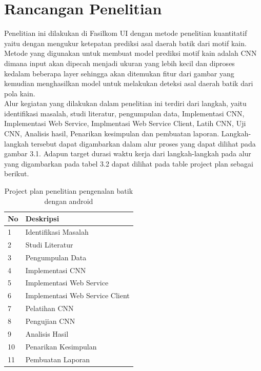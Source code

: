 \section{Rancangan Penelitian}
Penelitian ini dilakukan di Fasilkom UI dengan metode penelitian kuantitatif yaitu dengan mengukur ketepatan prediksi asal daerah batik dari motif kain. Metode yang digunakan untuk membuat model prediksi motif kain adalah CNN dimana input akan dipecah menjadi ukuran yang lebih kecil dan diproses kedalam beberapa layer sehingga akan ditemukan fitur dari gambar yang kemudian menghasilkan model untuk melakukan deteksi asal daerah batik dari pola kain.\\
Alur kegiatan yang dilakukan dalam penelitian ini terdiri dari langkah, yaitu identifikasi masalah, studi literatur, pengumpulan data, Implementasi CNN, Implementasi Web Service, Implmentasi Web Service Client, Latih CNN, Uji CNN, Analisis hasil, Penarikan kesimpulan dan pembuatan laporan. Langkah-langkah tersebut dapat digambarkan dalam alur proses yang dapat dilihat pada gambar 3.1. Adapun target durasi waktu kerja dari langkah-langkah pada alur yang digambarkan pada tabel 3.2 dapat dilihat pada table project plan sebagai berikut.\\
\begin{table}
	\centering
	\caption{Project plan penelitian pengenalan batik dengan android}
	\label{tab:tab1}
	\begin{tabular}{| l|l|}
		\hline
		No & Deskripsi \\ 
		\hline
		1 & Identifikasi Masalah \\
		\hline
		2 & Studi Literatur \\
		\hline
		3 & Pengumpulan Data \\
		\hline
		4 & Implementasi CNN\\
		\hline
		5 & Implementasi Web Service\\				
		\hline
		6 & Implementasi Web Service Client\\
		\hline
		7 & Pelatihan CNN\\
		\hline
		8 & Pengujian CNN\\
		\hline
		9 & Analisis Hasil \\
		\hline
		10 & Penarikan Kesimpulan\\
		\hline
		11 & Pembuatan Laporan\\
		\hline
	\end{tabular}
\end{table}
